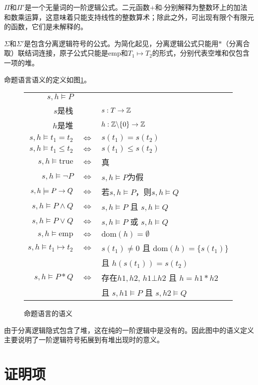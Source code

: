 $\Pi$和$\Pi'$是一个无量词的一阶逻辑公式。二元函数$+$和$\cdot$分别解释为整数环上的加法和数乘运算，这意味着只能支持线性的整数算术；除此之外，可出现有限个有限元的函数，它们是未解释的。

$\Sigma$和$\Sigma'$是包含分离逻辑符号的公式。为简化起见，分离逻辑公式只能用$\ast$（分离合取）联结词连接，原子公式只能是$\mathrm{emp}$和$T_1 \mapsto T_2$的形式，分别代表空堆和仅包含一项的堆。

命题语言语义的定义如图\ref{struct:semantic}。
\begin{figure}[!htbp]
  \centering
  \begin{tabular}{rcl}
    $s, h \models P$ & & \\
    $s$是栈 & & $s: T \rightarrow \mathbb{Z}$ \\
    $h$是堆 & & $h: \mathbb{Z} 	\backslash \{0\} \rightarrow \mathbb{Z}$ \\
    $s, h \models t_1 = t_2$ & $\iff$ & $s(t_1) = s(t_2)$ \\
    $s, h \models t_1 \leq t_2$ & $\iff$ & $s(t_1) \leq s(t_2)$ \\
    $s, h \models \mathrm{true}$ & $\iff$ & 真 \\
    $s, h \models \lnot P$ & $\iff$ & $s, h \models P$为假 \\
    $s, h \models P \rightarrow Q$ & $\iff$ & 若$s, h \models P$，则$s, h \models Q$ \\
    $s, h \models P \land Q$ & $\iff$ & $s, h \models P$ 且 $s, h \models Q$ \\
    $s, h \models P \lor Q$ & $\iff$ & $s, h \models P$ 或 $s, h \models Q$ \\
    $s, h \models \mathrm{emp}$ & $\iff$ & $\mathrm{dom}(h)= \emptyset$ \\
    $s, h \models t_1 \mapsto t_2$ & $\iff$ & $s(t_1) \neq 0$ 且 $\mathrm{dom}(h) = \{s(t_1)\}$ \\
    & & 且 $h(s(t_1)) = s(t_2)$ \\
    $s, h \models P \ast Q$ & $\iff$ & 存在$h1, h2$, $h1 \bot h2$ 且 $h = h1 \ast h2$ \\
    & & 且 $s, h1 \models P$ 且 $s, h2 \models Q$ \\
  \end{tabular}
  \caption{命题语言的语义}
  \label{struct:semantic}
\end{figure}

由于分离逻辑隐式包含了堆，这在纯的一阶逻辑中是没有的。因此图中的语义定义主要说明了一阶逻辑符号拓展到有堆出现时的意义。

\section{证明项}

